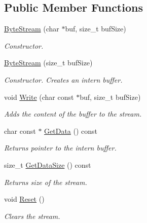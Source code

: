 \subsection*{Public Member Functions}
\begin{DoxyCompactItemize}
\item 
\hyperlink{class_common_1_1_byte_stream_a40d319a2f4b29672216a7cc135f2aa84}{Byte\-Stream} (char $\ast$buf, size\-\_\-t buf\-Size)
\begin{DoxyCompactList}\small\item\em Constructor. \end{DoxyCompactList}\item 
\hyperlink{class_common_1_1_byte_stream_aa98249a6d0a862fbb35ad27a1a60d01d}{Byte\-Stream} (size\-\_\-t buf\-Size)
\begin{DoxyCompactList}\small\item\em Constructor. Creates an intern buffer. \end{DoxyCompactList}\item 
void \hyperlink{class_common_1_1_byte_stream_a8ab16f23bce1e2cb0962761b9ac01be4}{Write} (char const $\ast$buf, size\-\_\-t buf\-Size)
\begin{DoxyCompactList}\small\item\em Adds the content of the buffer to the stream. \end{DoxyCompactList}\item 
char const $\ast$ \hyperlink{class_common_1_1_byte_stream_a91ca094a1637a948c279d9cab3f00887}{Get\-Data} () const 
\begin{DoxyCompactList}\small\item\em Returns pointer to the intern buffer. \end{DoxyCompactList}\item 
size\-\_\-t \hyperlink{class_common_1_1_byte_stream_a82ff2f3a9e446c716c6e0889691819d4}{Get\-Data\-Size} () const 
\begin{DoxyCompactList}\small\item\em Returns size of the stream. \end{DoxyCompactList}\item 
\hypertarget{class_common_1_1_byte_stream_a15ec1d409725f5ed875a733805bf0ba8}{void \hyperlink{class_common_1_1_byte_stream_a15ec1d409725f5ed875a733805bf0ba8}{Reset} ()}\label{class_common_1_1_byte_stream_a15ec1d409725f5ed875a733805bf0ba8}

\begin{DoxyCompactList}\small\item\em Clears the stream. \end{DoxyCompactList}\end{DoxyCompactItemize}


